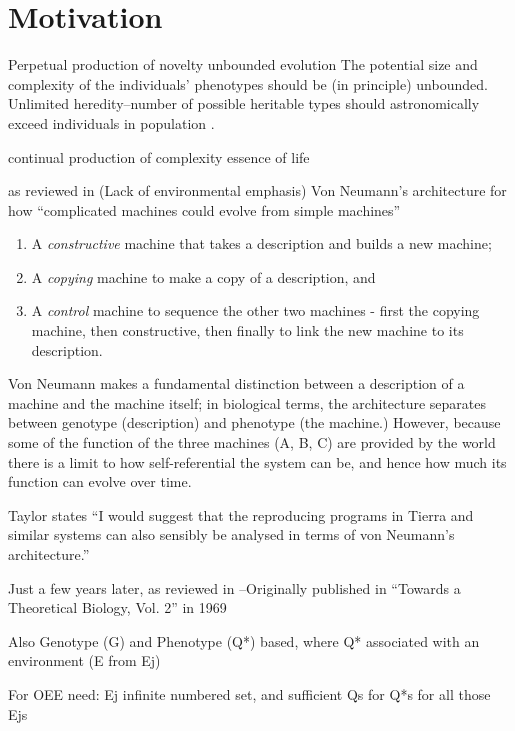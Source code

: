 \section{Motivation}\label{motivation}

\begin{NOTES}
Perpetual production of novelty
unbounded evolution
The potential size and complexity of the individuals' phenotypes should be (in principle) unbounded.  \parencite{Soros2014}
Unlimited heredity--number of possible heritable types should astronomically exceed individuals in population \parencite{Vasas2015}.

continual production of complexity
essence of life

\autocite{VonNeumann1966} as reviewed in \autocite{Taylor1999} (Lack of environmental emphasis)
Von Neumann's architecture for how ``complicated machines could evolve from simple machines''

\begin{enumerate}[label=\Alph*]
	\item A \emph{constructive} machine that takes a description and builds a new machine;
	\item A \emph{copying} machine to make a copy of a description, and 
	\item A \emph{control} machine to sequence the other two machines - first the copying machine, then constructive, then finally to link the new machine to its description.
\end{enumerate}

Von Neumann makes a fundamental distinction between a description of a machine and the machine itself; in biological terms, the architecture separates between genotype (description) and phenotype (the machine.) However, because some of the function of the three machines (A, B, C) are provided by the world there is a limit to how self-referential the system can be, and hence how much its function can evolve over time.

Taylor states ``I would suggest that the reproducing programs in Tierra and similar systems can also sensibly be analysed in terms of von Neumann's architecture.''

Just a few years later, \autocite{Waddington2008} as reviewed in \autocite{Taylor:1999sc}--Originally published in ``Towards a Theoretical Biology, Vol. 2'' in 1969

Also Genotype (G) and Phenotype (Q*) based, where Q* associated with an environment (E from Ej)

For OEE need: Ej infinite numbered set, and sufficient Qs for Q*s for all those Ejs


\end{NOTES}
